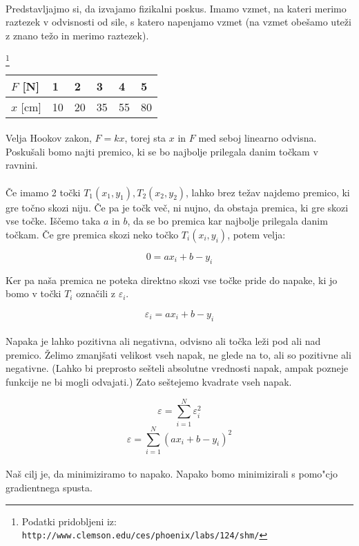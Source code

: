 \paragraph{}
	Predstavljajmo si, da izvajamo fizikalni poskus. Imamo vzmet, na kateri merimo raztezek v odvisnosti od sile, s katero napenjamo vzmet (na vzmet obešamo uteži z znano težo in merimo raztezek).

	\footnote{Podatki pridobljeni iz: \texttt{http://www.clemson.edu/ces/phoenix/labs/124/shm/}}
	\begin{tabular}{l|lllll}
		$F$ {[}N{]}  & 1  & 2  & 3  & 4  & 5  \\ \hline
		$x$ {[}cm{]} & 10 & 20 & 35 & 55 & 80
	\end{tabular}

	\paragraph{}
	Velja Hookov zakon, $F = k x$, torej sta $x$ in $F$ med seboj linearno odvisna. Poskušali bomo najti premico, ki se bo najbolje prilegala danim točkam v ravnini.

	\paragraph{}
	Če imamo 2 točki $T_1(x_1, y_1), T_2(x_2, y_2)$, lahko brez težav najdemo premico, ki gre točno skozi niju. Če pa je točk več, ni nujno, da obstaja premica, ki gre skozi vse točke.
	Iščemo taka $a$ in $b$, da se bo premica kar najbolje prilegala danim točkam. Če gre premica skozi neko točko $T_i(x_i, y_i)$, potem velja:

	$$0 = a x_i + b - y_i$$

	Ker pa naša premica ne poteka direktno skozi vse točke pride do napake, ki jo bomo v točki $T_i$ označili z $\varepsilon_i$.

	$$\varepsilon_i = a x_i + b - y_i$$

	\paragraph{}
	Napaka je lahko pozitivna ali negativna, odvisno ali točka leži pod ali nad premico. Želimo zmanjšati velikost vseh napak, ne glede na to, ali so pozitivne ali negativne. (Lahko bi preprosto sešteli absolutne vrednosti napak, ampak pozneje funkcije ne bi mogli odvajati.) Zato seštejemo kvadrate vseh napak.

	$$\varepsilon = \sum_{i=1}^{N} \varepsilon_i^2$$
	$$\varepsilon = \sum_{i=1}^{N} (a x_i + b - y_i)^2$$

	\paragraph{}
	Naš cilj je, da minimiziramo to napako. Napako bomo minimizirali s pomo"cjo gradientnega spusta.